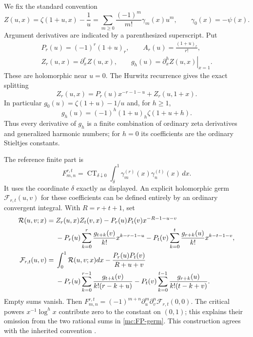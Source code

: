 We fix the standard convention
\begin{equation}\label{mc:stieltjes}
 Z(u,x)=\zeta(1+u,x)-\frac1u
     =\sum_{m\ge0}\frac{(-1)^m}{m!}\gamma_m(x)u^m,
 \qquad \gamma_0(x)=-\psi(x).
\end{equation}
Argument derivatives are indicated by a parenthesized superscript.
Put
\begin{equation}\label{mc:notation}
 \begin{gathered}
 P_r(u)=(-1)^r(1+u)_r,\qquad
 A_r(u)=\frac{(1+u)_r}{r!},\\
 Z_r(u,x)=\partial_x^r Z(u,x),\qquad
 g_h(u)=\left.\partial_x^h Z(u,x)\right|_{x=1}.
 \end{gathered}
\end{equation}
These are holomorphic near $u=0$. The Hurwitz recurrence
\cite[\S25.11]{DLMF} gives the exact splitting
\begin{equation}\label{mc:split}
       Z_r(u,x)=P_r(u)x^{-r-1-u}+Z_r(u,1+x).
\end{equation}
In particular $g_0(u)=\zeta(1+u)-1/u$ and, for $h\ge1$,
\begin{equation}\label{mc:g-explicit}
        g_h(u)=(-1)^h(1+u)_h\zeta(1+u+h).
\end{equation}
Thus every derivative of $g_h$ is a finite combination of
ordinary zeta derivatives and generalized harmonic numbers;
for $h=0$ its coefficients are the ordinary Stieltjes constants.

The reference finite part is
\begin{equation}\label{mc:FP}
 F_{m,n}^{r,t}=\operatorname{CT}_{\delta\downarrow0}
  \int_\delta^1\gamma_m^{(r)}(x)\gamma_n^{(t)}(x)\,dx.
\end{equation}
It uses the coordinate $\delta$ exactly as displayed. An explicit
holomorphic germ $\mathcal F_{r,t}(u,v)$ for these coefficients
can be defined entirely by an ordinary convergent integral.
With $R=r+t+1$, set
\begin{align}\label{mc:FP-remainder}
 \mathcal R(u,v;x)={}&Z_r(u,x)Z_t(v,x)
       -P_r(u)P_t(v)x^{-R-1-u-v}\notag\\
 &-P_r(u)\sum_{k=0}^r\frac{g_{t+k}(v)}{k!}x^{k-r-1-u}
  -P_t(v)\sum_{k=0}^t\frac{g_{r+k}(u)}{k!}x^{k-t-1-v},\\
 \mathcal F_{r,t}(u,v)={}&\int_0^1\mathcal R(u,v;x)dx
  -\frac{P_r(u)P_t(v)}{R+u+v}\notag\\
 &-P_r(u)\sum_{k=0}^{r-1}\frac{g_{t+k}(v)}{k!(r-k+u)}
  -P_t(v)\sum_{k=0}^{t-1}\frac{g_{r+k}(u)}{k!(t-k+v)}.
 \label{mc:FP-germ}
\end{align}
Empty sums vanish. Then
$F_{m,n}^{r,t}=(-1)^{m+n}\partial_u^m\partial_v^n
\mathcal F_{r,t}(0,0)$.
The critical powers $x^{-1}\log^h x$ contribute zero to the
constant on $(0,1)$; this explains their omission from the two
rational sums in \eqref{mc:FP-germ}. This construction agrees with
the inherited convention \cite{GapSix,LatticeIncoming}.

